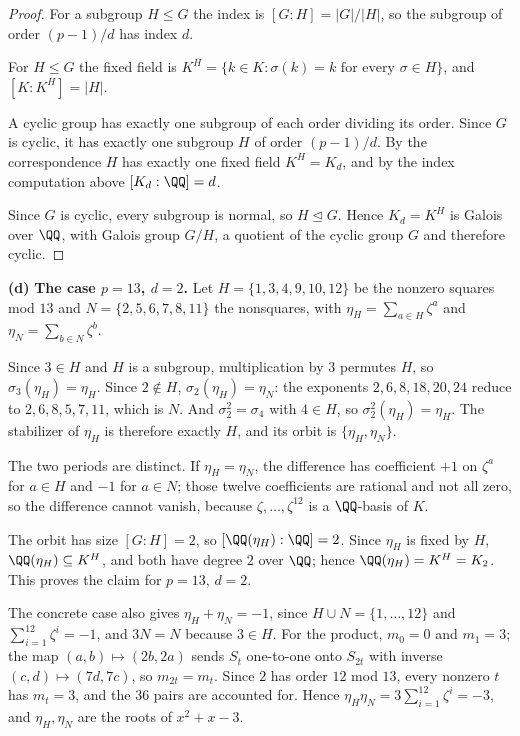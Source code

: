 \documentclass[11pt]{article}
\begin{document}
\begin{proof}
For a subgroup $H\le G$ the index is $[G:H]=|G|/|H|$, so the subgroup of order $(p-1)/d$ has index $d$.

For $H\le G$ the fixed field is $K^H=\{k\in K:\sigma(k)=k \text{ for every }\sigma\in H\}$, and $[K:K^H]=|H|$.

A cyclic group has exactly one subgroup of each order dividing its order. Since $G$ is cyclic, it has exactly one subgroup $H$ of order $(p-1)/d$. By the correspondence $H$ has exactly one fixed field $K^H=K_d$, and by the index computation above $[K_d:\QQ]=d$.

Since $G$ is cyclic, every subgroup is normal, so $H\unlhd G$. Hence $K_d=K^H$ is Galois over $\QQ$, with Galois group $G/H$, a quotient of the cyclic group $G$ and therefore cyclic.
\end{proof}
\noindent\textbf{(d)}
\textbf{The case $p=13$, $d=2$.} Let $H=\{1,3,4,9,10,12\}$ be the nonzero squares mod $13$ and $N=\{2,5,6,7,8,11\}$ the nonsquares, with $\eta_H=\sum_{a\in H}\zeta^a$ and $\eta_N=\sum_{b\in N}\zeta^b$.

Since $3\in H$ and $H$ is a subgroup, multiplication by $3$ permutes $H$, so $\sigma_3(\eta_H)=\eta_H$. Since $2\notin H$, $\sigma_2(\eta_H)=\eta_N$: the exponents $2,6,8,18,20,24$ reduce to $2,6,8,5,7,11$, which is $N$. And $\sigma_2^2=\sigma_4$ with $4\in H$, so $\sigma_2^2(\eta_H)=\eta_H$. The stabilizer of $\eta_H$ is therefore exactly $H$, and its orbit is $\{\eta_H,\eta_N\}$.

The two periods are distinct. If $\eta_H=\eta_N$, the difference has coefficient $+1$ on $\zeta^a$ for $a\in H$ and $-1$ for $a\in N$; those twelve coefficients are rational and not all zero, so the difference cannot vanish, because $\zeta,\dots,\zeta^{12}$ is a $\QQ$-basis of $K$.

The orbit has size $[G:H]=2$, so $[\QQ(\eta_H):\QQ]=2$. Since $\eta_H$ is fixed by $H$, $\QQ(\eta_H)\subseteq K^H$, and both have degree $2$ over $\QQ$; hence $\QQ(\eta_H)=K^H=K_2$. This proves the claim for $p=13$, $d=2$.

The concrete case also gives $\eta_H+\eta_N=-1$, since $H\cup N=\{1,\dots,12\}$ and $\sum_{i=1}^{12}\zeta^i=-1$, and $3N=N$ because $3\in H$. For the product, $m_0=0$ and $m_1=3$; the map $(a,b)\mapsto(2b,2a)$ sends $S_t$ one-to-one onto $S_{2t}$ with inverse $(c,d)\mapsto(7d,7c)$, so $m_{2t}=m_t$. Since $2$ has order $12$ mod $13$, every nonzero $t$ has $m_t=3$, and the $36$ pairs are accounted for. Hence $\eta_H\eta_N=3\sum_{i=1}^{12}\zeta^i=-3$, and $\eta_H,\eta_N$ are the roots of $x^2+x-3$.
\end{document}
